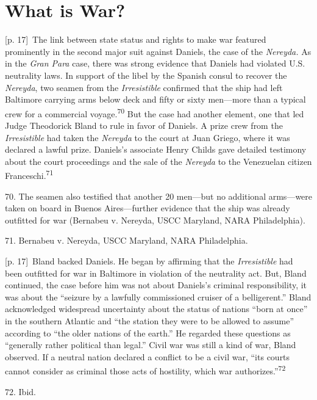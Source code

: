 \documentclass[10pt,a4paper]{article}
\begin{document}
\section*{What is War?}
{\scriptsize\color{gray} [p. 17]}\ The link between state status and rights to make war featured prominently in the second major suit against Daniels, the case of the \textit{Nereyda.} As in the \textit{Gran Para} case, there was strong evidence that Daniels had violated U.S. neutrality laws. In support of the libel by the Spanish consul to recover the \textit{Nereyda}, two seamen from the \textit{Irresistible} confirmed that the ship had left Baltimore carrying arms below deck and fifty or sixty men—more than a typical crew for a commercial voyage.\nobreak\textsuperscript{70} But the case had another element, one that led Judge Theodorick Bland to rule in favor of Daniels. A prize crew from the \textit{Irresistible} had taken the \textit{Nereyda} to the court at Juan Griego, where it was declared a lawful prize. Daniels’s associate Henry Childs gave detailed testimony about the court proceedings and the sale of the \textit{Nereyda} to the Venezuelan citizen Franceschi.\nobreak\textsuperscript{71}\par{\small 70. The seamen also testified that another 20 men—but no additional arms—were taken on board in Buenos Aires—further evidence that the ship was already outfitted for war (Bernabeu v. Nereyda, USCC Maryland, NARA Philadelphia).\par}{\small 71. Bernabeu v. Nereyda, USCC Maryland, NARA Philadelphia.\par}
{\scriptsize\color{gray} [p. 17]}\ Bland backed Daniels. He began by affirming that the \textit{Irresistible} had been outfitted for war in Baltimore in violation of the neutrality act. But, Bland continued, the case before him was not about Daniels’s criminal responsibility, it was about the “seizure by a lawfully commissioned cruiser of a belligerent.” Bland acknowledged widespread uncertainty about the status of nations “born at once” in the southern Atlantic and “the station they were to be allowed to assume” according to “the older nations of the earth.” He regarded these questions as “generally rather political than legal.” Civil war was still a kind of war, Bland observed. If a neutral nation declared a conflict to be a civil war, “its courts cannot consider as criminal those acts of hostility, which war authorizes.”\nobreak\textsuperscript{72}\par{\small 72. Ibid.\par}
\end{document}
